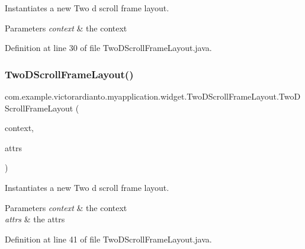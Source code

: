 Instantiates a new Two d scroll frame layout.


\begin{DoxyParams}{Parameters}
{\em context} & the context \\
\hline
\end{DoxyParams}


Definition at line 30 of file Two\+D\+Scroll\+Frame\+Layout.\+java.

\mbox{\label{classcom_1_1example_1_1victorardianto_1_1myapplication_1_1widget_1_1_two_d_scroll_frame_layout_ae59c58441dd9b1653cd43e4159b700c7}} 
\subsubsection{\texorpdfstring{Two\+D\+Scroll\+Frame\+Layout()}{TwoDScrollFrameLayout()}\hspace{0.1cm}{\footnotesize\ttfamily [2/3]}}
{\footnotesize\ttfamily com.\+example.\+victorardianto.\+myapplication.\+widget.\+Two\+D\+Scroll\+Frame\+Layout.\+Two\+D\+Scroll\+Frame\+Layout (\begin{DoxyParamCaption}\item[{@Non\+Null Context}]{context,  }\item[{@Nullable Attribute\+Set}]{attrs }\end{DoxyParamCaption})\hspace{0.3cm}{\ttfamily [inline]}}

Instantiates a new Two d scroll frame layout.


\begin{DoxyParams}{Parameters}
{\em context} & the context \\
\hline
{\em attrs} & the attrs \\
\hline
\end{DoxyParams}


Definition at line 41 of file Two\+D\+Scroll\+Frame\+Layout.\+java.

